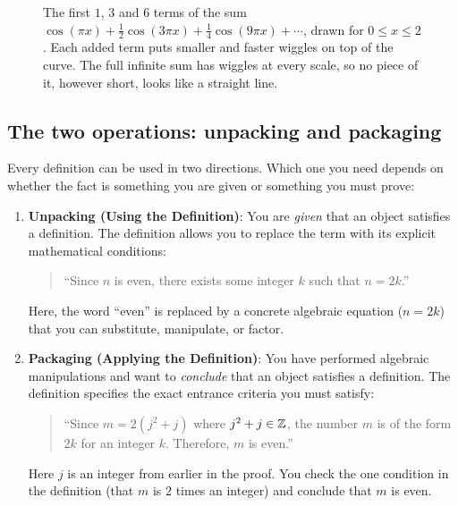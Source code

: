 \begin{figure}[htbp]
\centering
{}
\caption{The first $1$, $3$ and $6$ terms of the sum $\cos(\pi x) + \frac{1}{2}\cos(3\pi x) + \frac{1}{4}\cos(9\pi x) + \cdots$, drawn for $0 \le x \le 2$. Each added term puts smaller and faster wiggles on top of the curve. The full infinite sum has wiggles at every scale, so no piece of it, however short, looks like a straight line.}
\label{06:fig-weierstrass}
\end{figure}

\subsection{The two operations: unpacking and packaging}

Every definition can be used in two directions. Which one you need depends on whether the fact is something you are given or something you must prove:

\begin{enumerate}
\item \textbf{Unpacking (Using the Definition)}: You are \emph{given} that an object satisfies a definition. 
The definition allows you to replace the term with its explicit mathematical conditions:
\begin{quote}
``Since $n$ is even, there exists some integer $k$ such that $n = 2k$.''
\end{quote}
Here, the word ``even'' is replaced by a concrete algebraic equation ($n = 2k$) that you can substitute, manipulate, or factor.

\item \textbf{Packaging (Applying the Definition)}: You have performed algebraic manipulations and want to \emph{conclude} that an object satisfies a definition.
The definition specifies the exact entrance criteria you must satisfy:
\begin{quote}
``Since $m = 2(j^2 + j)$ where $j^2 + j \in \mathbb{Z}$, the number $m$ is of the form $2k$ for an integer $k$. Therefore, $m$ is even.''
\end{quote}
Here $j$ is an integer from earlier in the proof. You check the one condition in the definition (that $m$ is $2$ times an integer) and conclude that $m$ is even.
\end{enumerate}

